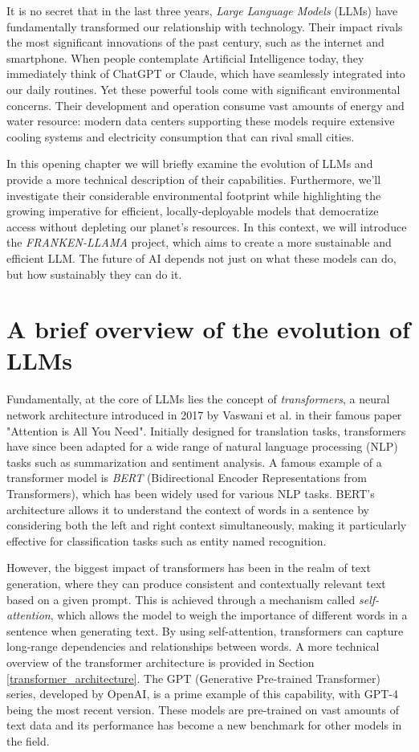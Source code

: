 It is no secret that in the last three years, \textit{Large Language Models} (LLMs) have fundamentally transformed our relationship with technology. 
Their impact rivals the most significant innovations of the past century, such as the internet and smartphone. When people contemplate Artificial Intelligence today, they immediately think of ChatGPT or Claude, which have seamlessly integrated into our daily routines.
Yet these powerful tools come with significant environmental concerns. Their development and operation consume vast amounts of energy and water resource: modern data centers supporting these models require extensive cooling systems and electricity consumption that can rival small cities.

In this opening chapter we will briefly examine the evolution of LLMs and provide a more technical description of their capabilities. Furthermore, we'll investigate their considerable environmental footprint while highlighting the growing imperative for efficient, locally-deployable models that democratize access without depleting our planet's resources. In this context, we will introduce the \textit{FRANKEN-LLAMA} project, which aims to create a more sustainable and efficient LLM.
The future of AI depends not just on what these models can do, but how sustainably they can do it.

\section{A brief overview of the evolution of LLMs}
Fundamentally, at the core of LLMs lies the concept of \textit{transformers}, a neural network architecture introduced in 2017 by Vaswani et al. in their famous paper "Attention is All You Need". Initially designed for translation tasks, transformers have since been adapted for a wide range of natural language processing (NLP) tasks such as summarization and sentiment analysis. A famous example of a transformer model is \textit{BERT} (Bidirectional Encoder Representations from Transformers), which has been widely used for various NLP tasks. BERT's architecture allows it to understand the context of words in a sentence by considering both the left and right context simultaneously, making it particularly effective for classification tasks such as entity named recognition.

However, the biggest impact of transformers has been in the realm of text generation, where they can produce consistent and contextually relevant text based on a given prompt. This is achieved through a mechanism called \textit{self-attention}, which allows the model to weigh the importance of different words in a sentence when generating text. By using self-attention, transformers can capture long-range dependencies and relationships between words. A more technical overview of the transformer architecture is provided in Section \ref{transformer_architecture}. The GPT (Generative Pre-trained Transformer) series, developed by OpenAI, is a prime example of this capability, with GPT-4 being the most recent version. These models are pre-trained on vast amounts of text data and its performance has become a new benchmark for other models in the field.

